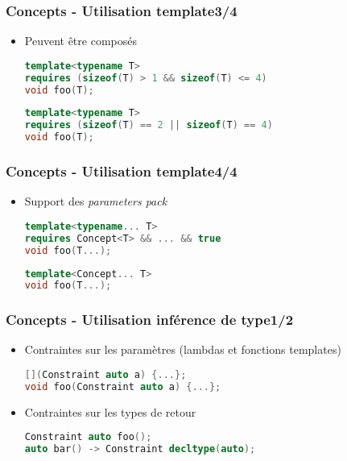 \documentclass[C++.tex]{subfiles}
\begin{document}
\begin{frame}[fragile]
	\frametitle{Concepts - Utilisation template\titlehfill{}3/4}
	\begin{itemize}
		\item Peuvent être composés

		\begin{lstlisting}[language=C++]
template<typename T>
requires (sizeof(T) > 1 && sizeof(T) <= 4)
void foo(T);\end{lstlisting}

		\begin{lstlisting}[language=C++]
template<typename T>
requires (sizeof(T) == 2 || sizeof(T) == 4)
void foo(T);\end{lstlisting}
	\end{itemize}
\end{frame}

\begin{frame}[fragile]
	\frametitle{Concepts - Utilisation template\titlehfill{}4/4}
	\begin{itemize}
		\item Support des \textit{parameters pack}

		\begin{lstlisting}[language=C++]
template<typename... T>
requires Concept<T> && ... && true
void foo(T...);\end{lstlisting}

		\begin{lstlisting}[language=C++]
template<Concept... T>
void foo(T...);\end{lstlisting}
	\end{itemize}
\end{frame}

\begin{frame}[fragile]
	\frametitle{Concepts - Utilisation inférence de type\titlehfill{}1/2}
	\begin{itemize}
		\item Contraintes sur les paramètres (lambdas et fonctions templates)

		\begin{lstlisting}[language=C++]
[](Constraint auto a) {...};
void foo(Constraint auto a) {...};\end{lstlisting}

		\item Contraintes sur les types de retour

		\begin{lstlisting}[language=C++]
Constraint auto foo();
auto bar() -> Constraint decltype(auto);\end{lstlisting}

	\end{itemize}
\end{frame}
\end{document}
